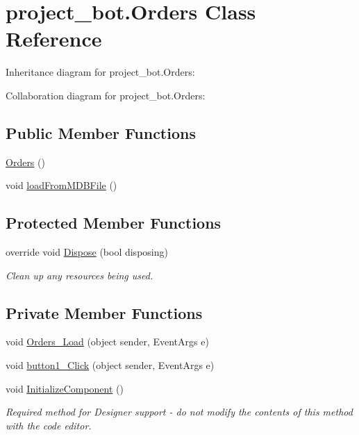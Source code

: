 \hypertarget{classproject__bot_1_1_orders}{}\section{project\+\_\+bot.\+Orders Class Reference}
\label{classproject__bot_1_1_orders}


Inheritance diagram for project\+\_\+bot.\+Orders\+:


Collaboration diagram for project\+\_\+bot.\+Orders\+:
\subsection*{Public Member Functions}
\begin{DoxyCompactItemize}
\item 
\hyperlink{classproject__bot_1_1_orders_aa04aa43a7ce406ffe815e47f16422668}{Orders} ()
\item 
void \hyperlink{classproject__bot_1_1_orders_a17069582eaf0396d663e03d59208f71f}{load\+From\+M\+D\+B\+File} ()
\end{DoxyCompactItemize}
\subsection*{Protected Member Functions}
\begin{DoxyCompactItemize}
\item 
override void \hyperlink{classproject__bot_1_1_orders_ac53ed0265f77bd3f88a095c6df3f2601}{Dispose} (bool disposing)
\begin{DoxyCompactList}\small\item\em Clean up any resources being used. \end{DoxyCompactList}\end{DoxyCompactItemize}
\subsection*{Private Member Functions}
\begin{DoxyCompactItemize}
\item 
void \hyperlink{classproject__bot_1_1_orders_a5f7d269f76edc56e956c62726c541334}{Orders\+\_\+\+Load} (object sender, Event\+Args e)
\item 
void \hyperlink{classproject__bot_1_1_orders_adfd8b1ab81941bd2c3f22157d5e78378}{button1\+\_\+\+Click} (object sender, Event\+Args e)
\item 
void \hyperlink{classproject__bot_1_1_orders_a68deaeda6bfb30c919e85e7304037ad5}{Initialize\+Component} ()
\begin{DoxyCompactList}\small\item\em Required method for Designer support -\/ do not modify the contents of this method with the code editor. \end{DoxyCompactList}\end{DoxyCompactItemize}
